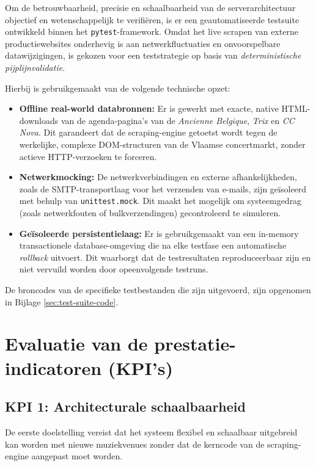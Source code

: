 Om de betrouwbaarheid, precisie en schaalbaarheid van de 
serverarchitectuur objectief en wetenschappelijk te verifiëren, 
is er een geautomatiseerde testsuite ontwikkeld binnen het 
\texttt{pytest}-framework. Omdat het live scrapen van externe 
productiewebsites onderhevig is aan netwerkfluctuaties en 
onvoorspelbare datawijzigingen, is gekozen voor een teststrategie 
op basis van \textit{deterministische pijplijnvalidatie}.

Hierbij is gebruikgemaakt van de volgende technische opzet:
\begin{itemize}
    \item \textbf{Offline real-world databronnen:} Er is gewerkt 
    met exacte, native HTML-downloads van de agenda-pagina's van de 
    \textit{Ancienne Belgique}, \textit{Trix} en \textit{CC Nova}. 
    Dit garandeert dat de scraping-engine getoetst wordt tegen de 
    werkelijke, complexe DOM-structuren van de Vlaamse concertmarkt, 
    zonder actieve HTTP-verzoeken te forceren.
    
    \item \textbf{Netwerkmocking:} De netwerkverbindingen en 
    externe afhankelijkheden, zoals de SMTP-transportlaag voor het 
    verzenden van e-mails, zijn geïsoleerd met behulp van 
    \texttt{unittest.mock}. Dit maakt het mogelijk om systeemgedrag 
    (zoals netwerkfouten of bulkverzendingen) gecontroleerd te simuleren.
    
    \item \textbf{Geïsoleerde persistentielaag:} Er is gebruikgemaakt 
    van een in-memory transactionele database-omgeving die na elke 
    testfase een automatische \textit{rollback} uitvoert. Dit waarborgt 
    dat de testresultaten reproduceerbaar zijn en niet vervuild worden 
    door opeenvolgende testruns.
\end{itemize}

De broncodes van de specifieke testbestanden die zijn 
uitgevoerd, zijn opgenomen in Bijlage \ref{sec:test-suite-code}.

\section{Evaluatie van de prestatie-indicatoren (KPI's)}
\label{sec:evaluatie-kpis}

\subsection{KPI 1: Architecturale schaalbaarheid}
De eerste doelstelling vereist dat het systeem flexibel en 
schaalbaar uitgebreid kan worden met nieuwe muziekvenues zonder 
dat de kerncode van de scraping-engine aangepast moet worden. 

